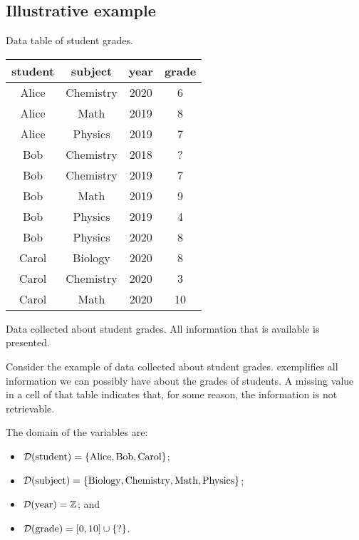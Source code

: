 \subsection{Illustrative example}

\begin{tablebox}[label=tab:grades1]{Data table of student grades.}
  \centering
  \begin{tabular}{cccc}
    \toprule
    \textbf{student} & \textbf{subject} & \textbf{year} & \textbf{grade} \\
    \midrule
    Alice & Chemistry & 2020 & 6 \\
    Alice & Math & 2019 & 8 \\
    Alice & Physics & 2019 & 7 \\
    Bob & Chemistry & 2018 & ? \\
    Bob & Chemistry & 2019 & 7 \\
    Bob & Math & 2019 & 9 \\
    Bob & Physics & 2019 & 4 \\
    Bob & Physics & 2020 & 8 \\
    Carol & Biology & 2020 & 8 \\
    Carol & Chemistry & 2020 & 3 \\
    Carol & Math & 2020 & 10 \\
    \bottomrule
  \end{tabular}
  \tcblower
  Data collected about student grades.  All information that is available is presented.
\end{tablebox}

Consider the example of data collected about student grades.  
exemplifies all information we can possibly have about the grades of students.  A missing
value in a cell of that table indicates that, for some reason, the information is not
retrievable.

The domain of the variables are:
\begin{itemize}
  \itemsep0em
  \item $\mathcal{D}\!\left(\text{student}\right) = \left\{\text{Alice}, \text{Bob}, \text{Carol}\right\}$;
  \item $\mathcal{D}\!\left(\text{subject}\right) = \left\{\text{Biology}, \text{Chemistry}, \text{Math},
    \text{Physics}\right\}$;
  \item $\mathcal{D}\!\left(\text{year}\right) = \mathbb{Z}$; and
  \item $\mathcal{D}\!\left(\text{grade}\right) = \left[0, 10\right] \cup \left\{\text{?}\right\}$.
\end{itemize}

